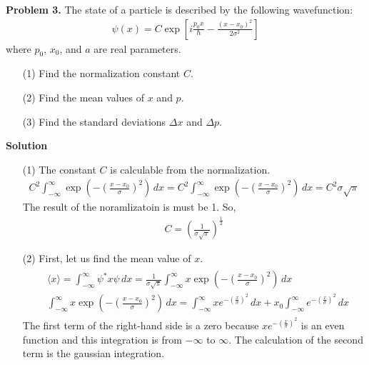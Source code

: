 \documentclass[floatfix,nofootinbib,superscriptaddress,fleqn]{revtex4}
\begin{document}
\noindent \textbf{Problem 3.} 
The state of a particle is described by the following wavefunction:
\begin{align*}
\psi(x) = C\exp\left[
i\frac{p_0 x}{\hbar} - \frac{(x-x_0)^2}{2\sigma^2} 
\right]
\end{align*}
where $p_0$, $x_0$, and $a$ are real parameters. 
\begin{itemize}
\item[(1)] Find the normalization constant $C$.
\item[(2)] Find the mean values of $x$ and $p$.
\item[(3)] Find the standard deviations $\Delta x$ and $\Delta p$.
\end{itemize}
\noindent \textbf{Solution}
\begin{itemize}
  \item[(1)] The constant $C$ is calculable from the normalization.
  \begin{align*}
    C^2\int_{-\infty}^{\infty} 
    \exp\left(-{\left(\frac{x-x_0}{\sigma} \right)}^2\right)\,dx 
    = C^2\int_{-\infty}^{\infty}
    \exp\left(-{\left(\frac{x-x_0}{\sigma} \right)}^2\right)\,dx 
    = C^2\sigma \sqrt{\pi}
  \end{align*}
The result of the noramlizatoin is must be 1. So,
  \begin{align}
    C = {\left(\frac{1}{\sigma \sqrt{\pi}}\right)}^{\frac{1}{2}}
  \end{align}
\item[(2)]First, let us find the mean value of $x$.
  \begin{align*}
    \begin{split}
      &\langle x \rangle=\int_{-\infty}^{\infty}\psi^*x\psi\,dx 
      = \frac{1}{\sigma\sqrt{\pi}}\int_{-\infty}^{\infty} x 
      \exp\left(-{\left( \frac{x-x_0}{\sigma} \right)}^2\right)\,dx \\
      &\int_{-\infty}^{\infty} x 
      \exp\left(-{\left(\frac{x-x_0}{\sigma} \right)}^2\right)\,dx 
      = \int_{-\infty}^{\infty} x 
      e^{-{\left(\frac{x}{\sigma}\right)}^2}\,dx 
      +x_0\int_{-\infty}^{\infty} 
      e^{-{\left(\frac{x}{\sigma}\right)}^2}\,dx
    \end{split}
  \end{align*}
The first term of the right-hand side is a zero 
because $x e^{-{\left(\frac{x}{\sigma}\right)}^2}$ 
is an even function and this integration is from $-\infty$ to $\infty$. 
The calculation of the second term is the gaussian integration.
  \begin{align*}

\end{align*}
\end{itemize}
\end{document}
